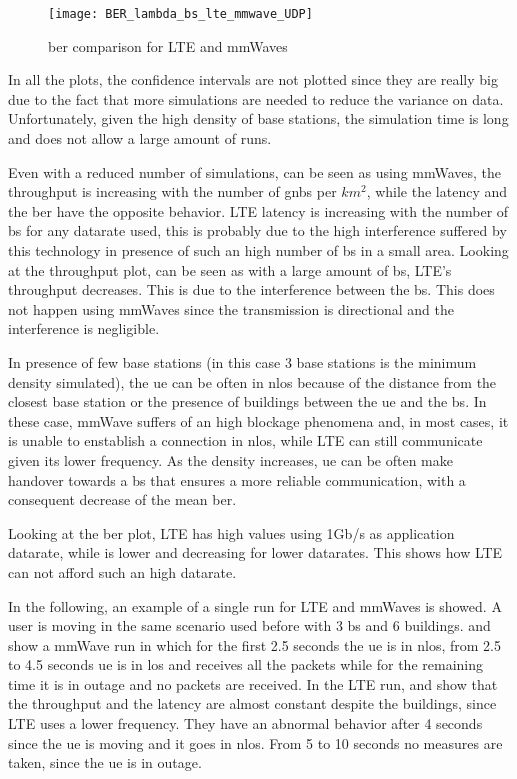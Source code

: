 \begin{figure}[ht]
  \texttt{[image: BER\_lambda\_bs\_lte\_mmwave\_UDP]}
  \caption{\gls{ber} comparison for LTE and mmWaves}
  \label{fig:mmWaves-BER}
\end{figure}

In all the plots, the confidence intervals are not plotted since they are really big due to the fact that more simulations are needed to reduce the variance on data. Unfortunately, given the high density of base stations, the simulation time is long and does not allow a large amount of runs.

Even with a reduced number of simulations, can be seen as using \gls{mmWaves}, the throughput is increasing with the number of \gls{gnb}s per $km^2$, while the latency and the \gls{ber} have the opposite behavior.
LTE latency is increasing with the number of \gls{bs} for any datarate used, this is probably due to the high interference suffered by this technology in presence of such an high number of \gls{bs} in a small area.
Looking at the throughput plot, can be seen as with a large amount of \gls{bs}, LTE's throughput decreases. This is due to the interference between the \gls{bs}. This does not happen using mmWaves since the transmission is directional and the interference is negligible.

In presence of few base stations (in this case 3 base stations is the minimum density simulated), the \gls{ue} can be often in \gls{nlos} because of the distance from the closest base station or the presence of buildings between the \gls{ue} and the \gls{bs}. In these case, mmWave suffers of an high blockage phenomena and, in most cases, it is unable to enstablish a connection in \gls{nlos}, while LTE can still communicate given its lower frequency. As the density increases, \gls{ue} can be often make handover towards a \gls{bs} that ensures a more reliable communication, with a consequent decrease of the mean \gls{ber}.

Looking at the \gls{ber} plot, LTE has high values using 1Gb/s as application datarate, while is lower and decreasing for lower datarates. This shows how LTE can not afford such an high datarate.

In the following, an example of a single run for LTE and mmWaves is showed. A user is moving in the same scenario used before with 3 \gls{bs} and 6 buildings.
 and  show a mmWave run in which for the first 2.5 seconds the \gls{ue} is in \gls{nlos}, from 2.5 to 4.5 seconds \gls{ue} is in \gls{los} and receives all the packets while for the remaining time it is in outage and no packets are received.
In the LTE run,  and  show that the throughput and the latency are almost constant despite the buildings, since LTE uses a lower frequency. They have an abnormal behavior after 4 seconds since the \gls{ue} is moving and it goes in \gls{nlos}. From 5 to 10 seconds no measures are taken, since the \gls{ue} is in outage.

